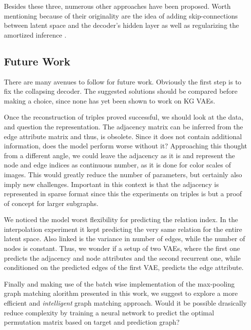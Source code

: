 Besides these three, numerous other approaches have been proposed. Worth mentioning because of their originality are the idea of adding skip-connections between latent space and the decoder's hidden layer \cite{dieng_avoiding_2019} as well as regularizing the amortized inference \cite{shu_amortized_2019}.  







\subsection{Future Work}

There are many avenues to follow for future work. Obviously the first step is to fix the collapsing decoder. The suggested solutions should be compared before making a choice, since none has yet been shown to work on KG VAEs.

Once the reconstruction of triples proved successful, we should look at the data, and question the representation. The adjacency matrix can be inferred from the edge attribute matrix and thus, is obsolete. Since it does not contain additional information, does the model perform worse without it? Approaching this thought from a different angle, we could leave the adjacency as it is and represent the node and edge indices as continuous number, as it is done for color scales of images. This would greatly reduce the number of parameters, but certainly also imply new challenges. Important in this context is that the adjacency is represented in sparse format since this the experiments on triples is but a proof of concept for larger subgraphs. 

We noticed the model worst flexibility for predicting the relation index. In the interpolation experiment it kept predicting the very same relation for the entire latent space. Also linked is the variance in number of edges, while the number of nodes is constant. Thus, we wonder if a setup of two VAEs, where the first one predicts the adjacency and node attributes and the second recurrent one, while conditioned on the predicted edges of the first VAE, predicts the edge attribute.

Finally and making use of the batch wise implementation of the max-pooling graph matching alorithm presented in this work, we suggest to explore a more efficient and \textit{intelligent} graph matching approach. Would it be possible drasically reduce complexity by training a neural network to predict the optimal permutation matrix based on target and prediction graph?

